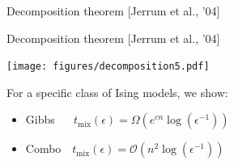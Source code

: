 \documentclass[mathserif]{beamer}
\newcommand{\qcite}[1]{{\scriptsize\color{col1}[#1]}}
\begin{document}
\begin{frame}{Decomposition theorem \qcite{Jerrum et al., '04}}
\vspace{1em}
\centering
{}%
%
%
%
\\[0.1em]
\end{frame}

\begin{frame}{Decomposition theorem \qcite{Jerrum et al., '04}}
\begin{center}
\texttt{[image: figures/decomposition5.pdf]}
\end{center}

For a specific class of Ising models, we show:\\[1em]
\begin{itemize}
\item Gibbs $\ \ \ \ \ \ t_{\textrm{mix}}(\epsilon) = \Omega\left( e^{cn}\log(\epsilon^{-1}) \right)$\\[1em]
\item Combo $\ \ \ t_{\textrm{mix}}(\epsilon) = \mathcal{O}\left( n^2 \log(\epsilon^{-1}) \right)$
\end{itemize}
\end{frame}
\end{document}
